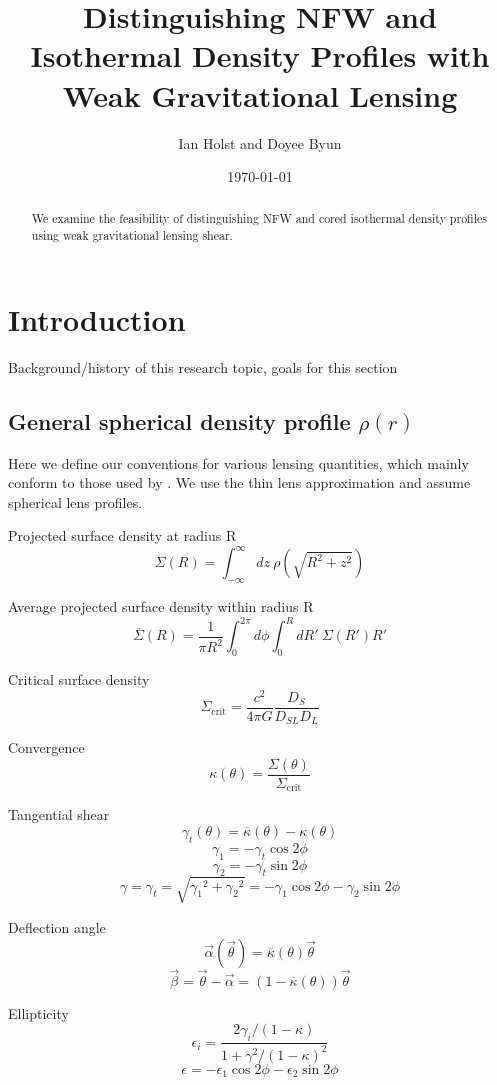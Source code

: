 \documentclass[10pt]{article}
\begin{document}
\title{Distinguishing NFW and Isothermal Density Profiles with Weak Gravitational Lensing}
\author{Ian Holst and Doyee Byun}
\date{\today}
\maketitle

\begin{abstract}
We examine the feasibility of distinguishing NFW and cored isothermal density profiles using weak gravitational lensing shear.
\end{abstract}

\section{Introduction}
Background/history of this research topic, goals for this section

\subsection{General spherical density profile $\rho(r)$}
Here we define our conventions for various lensing quantities, which mainly conform to those used by \citet{Dodelson2017}. We use the thin lens approximation and assume spherical lens profiles.

Projected surface density at radius R
\[\Sigma(R) = \int_{-\infty}^{\infty}{dz\ \rho(\sqrt{R^2 + z^2})}\]

Average projected surface density within radius R
\[\overline{\Sigma}(R) = \frac{1}{\pi R^2} \int_0^{2\pi}{d\phi \int_0^{R}{dR'~\Sigma(R')R'}}\]

Critical surface density
\[\Sigma_\mathrm{crit} = \frac{c^2}{4\pi G} \frac{D_S}{D_{SL} D_L}\]

Convergence
\[\kappa(\theta) = \frac{\Sigma(\theta)}{\Sigma_\mathrm{crit}}\]

Tangential shear
\[\gamma_t(\theta) = \overline{\kappa}(\theta) - \kappa(\theta)\]
\[\gamma_1 = -\gamma_t \cos{2\phi}\]
\[\gamma_2 = -\gamma_t \sin{2\phi}\]
\[\gamma = \gamma_t = \sqrt{{\gamma_1}^2 + {\gamma_2}^2} = -\gamma_1 \cos{2\phi} -\gamma_2 \sin{2\phi}\]

Deflection angle
\[\vec{\alpha}(\vec{\theta}) = \overline{\kappa}(\theta)\vec{\theta}\]
\[\vec{\beta} = \vec{\theta} - \vec{\alpha} = (1 - \overline{\kappa}(\theta))\vec{\theta} \]

Ellipticity
\[\epsilon_i = \frac{2 \gamma_i/(1 - \kappa)}{1 + \gamma^2/(1 - \kappa)^2}\]
\[\epsilon =  -\epsilon_1 \cos{2\phi} -\epsilon_2 \sin{2\phi}\]
\end{document}
